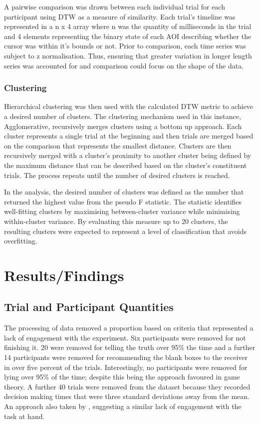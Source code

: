 \documentclass[man, floatsintext]{apa7}
\begin{document}
A pairwise comparison was drawn between each individual trial for each participant using  DTW as a measure of similarity. Each trial's timeline was represented in a n x 4 array where n was the quantity of milliseconds in the trial and 4 elements representing the binary state of each AOI describing whether the cursor was within it's bounds or not. Prior to comparison, each time series was subject to z normalisation. Thus, ensuring that greater variation in longer length series was accounted for and comparison could focus on the shape of the data.

\subsubsection{Clustering}

Hierarchical clustering was then used with the calculated DTW metric to achieve a desired number of clusters. The clustering mechanism used in this instance, Agglomerative, recursively merges clusters using a bottom up approach. Each cluster represents a single trial at the beginning and then trials are merged based on the comparison that represents the smallest distance. Clusters are then recursively merged with a cluster's proximity to another cluster being defined by the maximum distance that can be described based on the cluster's constituent trials. The process repeats until the number of desired clusters is reached.

In the analysis, the desired number of clusters was defined as the number that returned the highest value from the pseudo F statistic. The statistic identifies well-fitting clusters by maximising between-cluster variance while minimising within-cluster variance. By evaluating this measure up to 20 clusters, the resulting clusters were expected to represent a level of classification that avoids overfitting.



\section{Results/Findings}

\subsection{Trial and Participant Quantities}
\label{subsec:quantities}
The processing of data removed a proportion based on criteria that represented a lack of engagement with the experiment. Six participants were removed for not finishing it. 20 were removed for telling the truth over 95\% the time and a further 14 participants were removed for recommending the blank boxes to the receiver in over five percent of the trials.  Interestingly, no participants were removed for lying over 95\% of the time; despite this being the approach favoured in game theory.  A further 40 trials were removed from the dataset because they recorded decision making times that were three standard deviations away from the mean. An approach also taken by \citeauthor{reeckSearchPredictsChanges2017b}, suggesting a similar lack of engagement with the task at hand.
\end{document}
